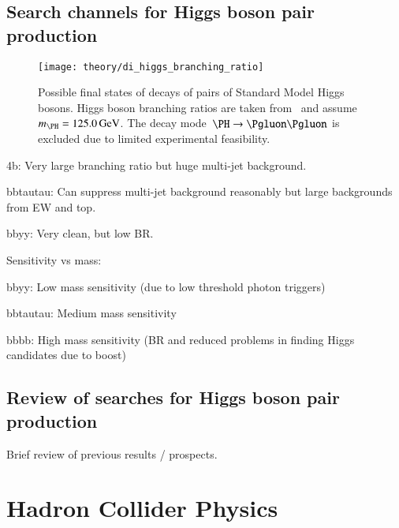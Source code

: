 \subsection{Search channels for Higgs boson pair production}

\begin{figure}[htbp]
  \centering
  \texttt{[image: theory/di\_higgs\_branching\_ratio]}
  \caption{Possible final states of decays of pairs of Standard Model
    Higgs bosons. Higgs boson branching ratios are taken
    from~\cite{deFlorian:2016spz} and
    assume~$m_{\PH} = \SI{125.0}{\GeV}$. The decay
    mode~$\PH \ra \Pgluon\Pgluon$ is excluded due to limited
    experimental feasibility.}
  \label{fig:hh_branching_ratios}
\end{figure}

4b: Very large branching ratio but huge multi-jet background.

bbtautau: Can suppress multi-jet background reasonably but large
backgrounds from EW and top.

bbyy: Very clean, but low BR.



Sensitivity vs mass:

bbyy: Low mass sensitivity (due to low threshold photon triggers)

bbtautau: Medium mass sensitivity

bbbb: High mass sensitivity (BR and reduced problems in finding Higgs
candidates due to boost)



\subsection{Review of searches for Higgs boson pair production}

Brief review of previous results / prospects.


\section{Hadron Collider Physics}


